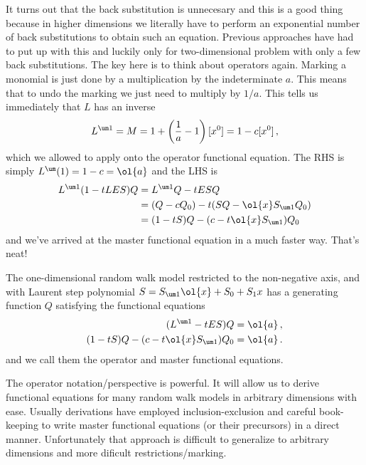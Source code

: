It turns out that the back substitution is unnecesary and this is a good thing because in higher dimensions we literally have to perform an exponential number of back substitutions to obtain such an equation. Previous approaches have had to put up with this and luckily only for two-dimensional problem with only a few back substitutions. The key here is to think about operators again. Marking a monomial is just done by a multiplication by the indeterminate $a$. This means that to undo the marking we just need to multiply by $1/a$. This tells us immediately that $L$ has an inverse
\begin{align}
	L^{\um 1} = M = 1 + \left(\frac 1a - 1\right)[x^0] = 1- c[x^0]\,,
\end{align}
which we allowed to apply onto the operator functional equation. The RHS is simply $L^{\um} (1) = 1 - c = \ol{a}$ and the LHS is
\begin{align}
	L^{\um 1}(1-tLES)Q &= L^{\um 1}Q - tESQ \\
	&= (Q-cQ_0) - t(SQ - \ol{x}S_{\um 1}Q_0) \\
	&= (1-tS)Q - (c-t\ol{x}S_{\um 1})Q_0 
\end{align}
and we've arrived at the master functional equation in a much faster way. That's neat!
\begin{prop} The one-dimensional random walk model restricted to the non-negative axis, and with Laurent step polynomial $S = S_{\um 1}\ol{x}+S_0 + S_1 x$ has a generating function $Q$ satisfying the functional equations
\begin{align}
	(L^{\um 1}-tES)Q &= \ol{a}\,,\\
	(1-tS)Q-(c-t\ol{x}S_{\um 1})Q_0 &= \ol{a}\,.
\end{align}
and we call them the operator and master functional equations.
\end{prop}
The operator notation/perspective is powerful. It will allow us to derive functional equations for many random walk models in arbitrary dimensions with ease. Usually derivations have employed inclusion-exclusion and careful book-keeping to write master functional equations (or their precursors) in a direct manner. Unfortunately that approach is difficult to generalize to arbitrary dimensions and more dificult restrictions/marking.

